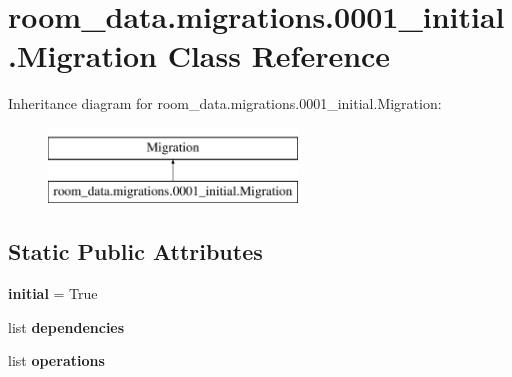 \hypertarget{classroom__data_1_1migrations_1_10001__initial_1_1_migration}{\section{room\-\_\-data.\-migrations.0001\-\_\-initial.Migration Class Reference}
\label{classroom__data_1_1migrations_1_10001__initial_1_1_migration}
}
Inheritance diagram for room\-\_\-data.\-migrations.0001\-\_\-initial.Migration\-:\begin{figure}[H]
\begin{center}
\leavevmode
\includegraphics[height=2.000000cm]{classroom__data_1_1migrations_1_10001__initial_1_1_migration}
\end{center}
\end{figure}
\subsection*{Static Public Attributes}
\begin{DoxyCompactItemize}
\item 
\hypertarget{classroom__data_1_1migrations_1_10001__initial_1_1_migration_a381ac13c35311727d04e86e257323e0e}{{\bfseries initial} = True}\label{classroom__data_1_1migrations_1_10001__initial_1_1_migration_a381ac13c35311727d04e86e257323e0e}

\item 
list {\bfseries dependencies}
\item 
list {\bfseries operations}
\end{DoxyCompactItemize}


